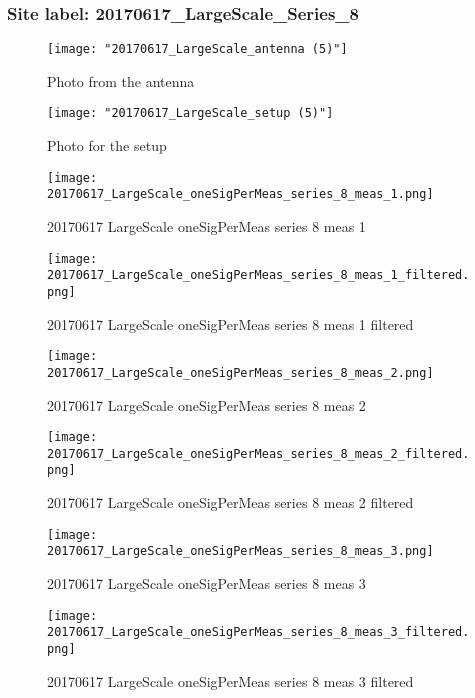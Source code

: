 \subsubsection{Site label: 20170617\_LargeScale\_Series\_8}
\begin{figure}[ht] \caption{Photo from the antenna}
\texttt{[image: "20170617\_LargeScale\_antenna (5)"]}\centering\end{figure}
\begin{figure}[ht] \caption{Photo for the setup}
\texttt{[image: "20170617\_LargeScale\_setup (5)"]}\centering\end{figure}
\begin{figure}[ht] \caption{20170617 LargeScale oneSigPerMeas series 8 meas 1}
\texttt{[image: 20170617\_LargeScale\_oneSigPerMeas\_series\_8\_meas\_1.png]}\centering\end{figure}
\begin{figure}[ht] \caption{20170617 LargeScale oneSigPerMeas series 8 meas 1 filtered}
\texttt{[image: 20170617\_LargeScale\_oneSigPerMeas\_series\_8\_meas\_1\_filtered.png]}\centering\end{figure}
\begin{figure}[ht] \caption{20170617 LargeScale oneSigPerMeas series 8 meas 2}
\texttt{[image: 20170617\_LargeScale\_oneSigPerMeas\_series\_8\_meas\_2.png]}\centering\end{figure}
\begin{figure}[ht] \caption{20170617 LargeScale oneSigPerMeas series 8 meas 2 filtered}
\texttt{[image: 20170617\_LargeScale\_oneSigPerMeas\_series\_8\_meas\_2\_filtered.png]}\centering\end{figure}
\begin{figure}[ht] \caption{20170617 LargeScale oneSigPerMeas series 8 meas 3}
\texttt{[image: 20170617\_LargeScale\_oneSigPerMeas\_series\_8\_meas\_3.png]}\centering\end{figure}
\begin{figure}[ht] \caption{20170617 LargeScale oneSigPerMeas series 8 meas 3 filtered}
\texttt{[image: 20170617\_LargeScale\_oneSigPerMeas\_series\_8\_meas\_3\_filtered.png]}\centering\end{figure}
\clearpage
